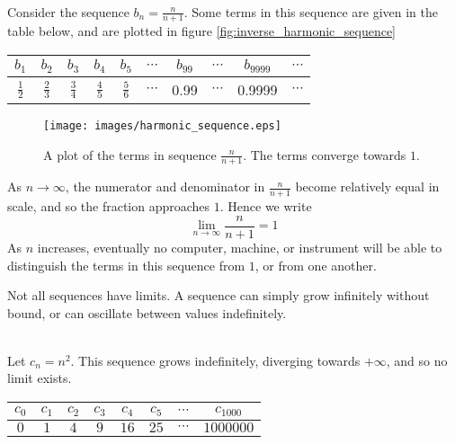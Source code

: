 \\
Consider the sequence $b_n=\frac{n}{n+1}$. Some terms in this sequence are given in the table below, and are plotted in figure \vref{fig:inverse_harmonic_sequence}

\begin{center}
\begin{tabular}{|c|c|c|c|c|c|c|c|c|c|}
\hline
$b_1$ & $b_2$ & $b_3$ & $b_4$ & $b_5$ & $\cdots$ & $b_{99}$ & $\cdots$ & $b_{9999}$ & $\cdots$  \\
\hline
$\frac{1}{2}$ & $\frac{2}{3}$ & $\frac{3}{4}$ & $\frac{4}{5}$  & $\frac{5}{6}$  & $\cdots$ & 0.99 & $\cdots $  & 0.9999 & $\cdots $\\
\hline
\end{tabular}
\end{center}

\begin{figure}
  \centering
  \texttt{[image: images/harmonic\_sequence.eps]}
  \caption{A plot of the terms in sequence $\frac{n}{n+1}$. The terms converge towards $1$. }
  \label{fig:inverse_harmonic_sequence}
\end{figure}
As $n \to \infty$, the numerator and denominator in $\frac{n}{n+1}$ become relatively equal in scale, and so the fraction approaches $1$. Hence we write
\begin{equation*}
  \lim_{n \to \infty} \frac{n}{n+1}  = 1
\end{equation*}
As $n$ increases, eventually no computer, machine, or instrument will be able to distinguish the terms in this sequence from $1$, or from one another.

Not all sequences have limits. A sequence can simply grow infinitely without bound, or can oscillate between values indefinitely.


\\
Let $c_n=n^2$. This sequence grows indefinitely, diverging towards $+ \infty$, and so no limit exists.
\begin{center}
\begin{tabular}{|c|c|c|c|c|c|c|c|}
\hline
$c_0$ & $c_1$ & $c_2$ & $c_3$ & $c_4$ & $c_5$ & $\cdots$ & $c_{1000}$  \\
\hline
$0$ & $1$ & $4$ & $9$ & $16$ & $25$ & $\cdots$ & $1000000$ \\
\hline
\end{tabular}
\end{center}

